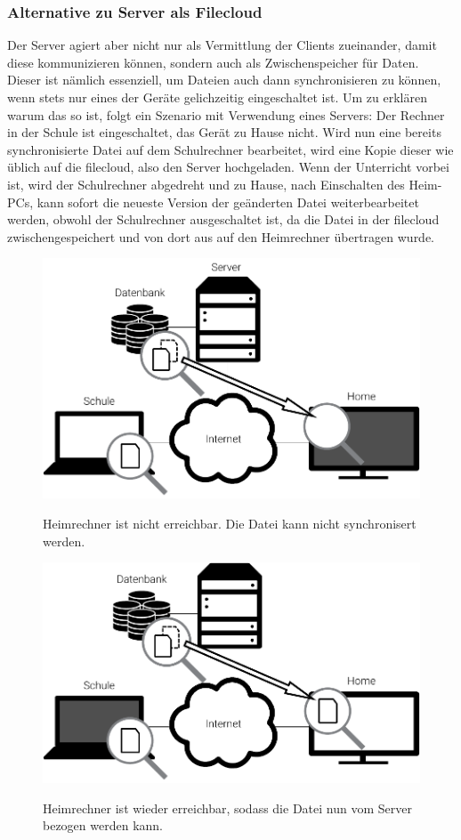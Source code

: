 \subsubsection{Alternative zu Server als Filecloud}
Der Server agiert aber nicht nur als Vermittlung der Clients zueinander, damit diese
kommunizieren können, sondern auch als Zwischenspeicher für Daten. Dieser ist nämlich
essenziell, um Dateien auch dann synchronisieren zu können, wenn stets nur eines der
Geräte gelichzeitig eingeschaltet ist. Um zu erklären warum das
so ist, folgt ein Szenario mit Verwendung eines Servers:
Der Rechner in der Schule ist eingeschaltet, das Gerät zu Hause nicht. Wird nun
eine bereits synchronisierte Datei auf dem Schulrechner bearbeitet, wird eine Kopie dieser wie
üblich auf die \gls{filecloud}, also den Server hochgeladen. Wenn der Unterricht vorbei ist,
wird der Schulrechner abgedreht und zu Hause, nach Einschalten des Heim-PCs, kann sofort die neueste Version der
geänderten Datei weiterbearbeitet werden, obwohl der Schulrechner ausgeschaltet ist, da die Datei in der \gls{filecloud}
zwischengespeichert und von dort aus auf den Heimrechner übertragen wurde.
\begin{figure}[htb]
	\centering
  \includegraphics[]{images/dropbox_temp_1}
	\label{dropbox_temp_1}
  \caption{Heimrechner ist nicht erreichbar. Die Datei kann nicht synchronisert werden.}
\end{figure}

\begin{figure}[htb]
	\centering
  \includegraphics[]{images/dropbox_temp_2}
	\label{dropbox_temp_2}
  \caption{Heimrechner ist wieder erreichbar, sodass die Datei nun vom Server
	bezogen werden kann.}
\end{figure}

